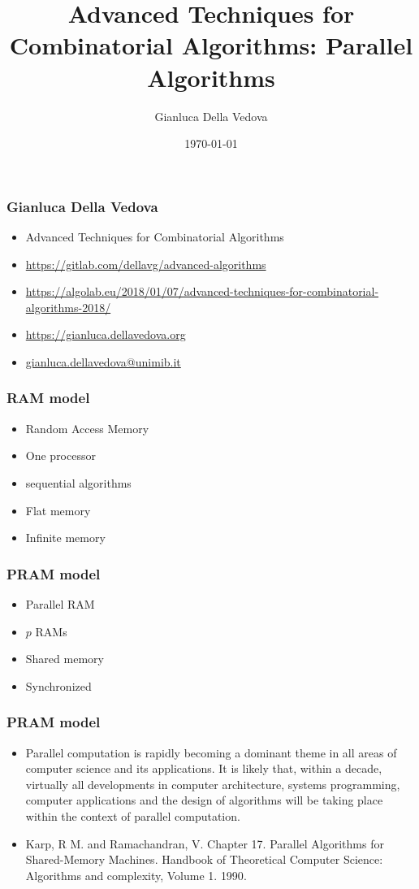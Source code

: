 \documentclass[12pt,aspectratio=169]{beamer}
\author{Gianluca Della Vedova}
\title[Advanced Algorithms]{Advanced Techniques for Combinatorial Algorithms:
Parallel Algorithms}
\institute[]{Univ. Milano--Bicocca\\
  \texttt{https://gianluca.dellavedova.org}}
\date[]{{\tiny \today\hspace{1em} \vcsShortHash}}
\begin{document}
\begin{frame}
  \titlepage
\end{frame}


\begin{frame}\frametitle{Gianluca Della Vedova}
  \begin{itemize}
  \item
                Advanced Techniques for Combinatorial Algorithms
\item
{\small\url{https://gitlab.com/dellavg/advanced-algorithms}}
\item
{\small\url{https://algolab.eu/2018/01/07/advanced-techniques-for-combinatorial-algorithms-2018/}}
\item
{\small\url{https://gianluca.dellavedova.org}}
  \item
{\small\url{gianluca.dellavedova@unimib.it}}
  \end{itemize}
\end{frame}



\begin{frame}\frametitle{RAM model}
  \begin{itemize}
  \item
    Random Access Memory
  \item
    One processor
  \item
    sequential algorithms
  \item
    Flat memory
  \item
    Infinite memory
  \end{itemize}
\end{frame}

\begin{frame}\frametitle{PRAM model}
  \begin{itemize}
  \item
    \alert{Parallel} RAM
  \item
    $p$ RAMs
  \item
    Shared memory
  \item
    Synchronized
  \end{itemize}
\end{frame}

\begin{frame}\frametitle{PRAM model}
  \begin{itemize}
  \item
Parallel computation is \alert{rapidly} becoming a \alert{dominant} theme in all areas of
computer science and its applications.
It is likely that, \alert{within a decade}, virtually all developments in computer
architecture, systems programming, computer applications and the design of
algorithms will be taking place within the context of parallel computation.
\item
\small  Karp, R M. and Ramachandran, V. Chapter 17. Parallel Algorithms for
  Shared-Memory Machines. Handbook of Theoretical Computer Science: Algorithms and complexity, Volume 1.
 \alert{1990}.
\end{itemize}
\end{frame}
\end{document}
